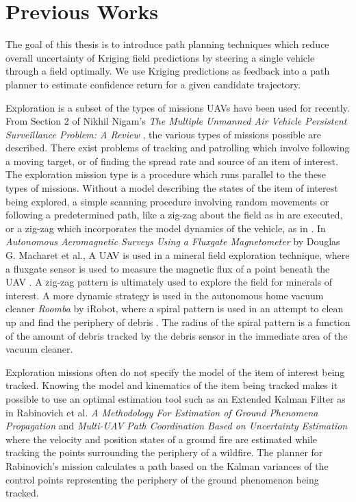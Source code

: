 \section{Previous Works} \label{sec:prev_works}
The goal of this thesis is to introduce path planning techniques which reduce overall uncertainty of Kriging field predictions by steering a single vehicle through a field optimally. We use Kriging predictions as feedback into a path planner to estimate confidence return for a given candidate trajectory.

Exploration is a subset of the types of missions UAVs have been used for recently. From Section 2 of Nikhil Nigam's \textit{The Multiple Unmanned Air Vehicle Persistent Surveillance Problem: A Review} \cite{nigam:missions}, the various types of missions possible are described. There exist problems of tracking and patrolling which involve following a moving target, or of finding the spread rate and source of an item of interest. The exploration mission type is a procedure which runs parallel to the these types of missions. Without a model describing the states of the item of interest being explored, a simple scanning procedure involving random movements or following a predetermined path, like a zig-zag about the field as in \cite{semsch:uav_zig} are executed, or a zig-zag which incorporates the model dynamics of the vehicle, as in \cite{nigam:zigzag}. In \textit{Autonomous Aeromagnetic Surveys Using a Fluxgate Magnetometer} by Douglas G. Macharet et al., A UAV is used in a mineral field exploration technique, where a fluxgate sensor is used to measure the magnetic flux of a point beneath the UAV \cite{macharet:magnet}. A zig-zag pattern is ultimately used to explore the field for minerals of interest. A more dynamic strategy is used in the autonomous home vacuum cleaner \textit{Roomba} by iRobot, where a spiral pattern is used in an attempt to clean up and find the periphery of debris \cite{roomba:spiral}. The radius of the spiral pattern is a function of the amount of debris tracked by the debris sensor in the immediate area of the vacuum cleaner.

Exploration missions often do not specify the model of the item of interest being tracked. Knowing the model and kinematics of the item being tracked makes it possible to use an optimal estimation tool such as an Extended Kalman Filter as in Rabinovich et al. \textit{A Methodology For Estimation of Ground Phenomena Propagation} \cite{sharon:uav_est} and \textit{Multi-UAV Path Coordination Based on Uncertainty Estimation} \cite{sharon:uav_uncert} where the velocity and position states of a ground fire are estimated while tracking the points surrounding the periphery of a wildfire. The planner for Rabinovich's mission calculates a path based on the Kalman variances of the control points representing the periphery of the ground phenomenon being tracked.

